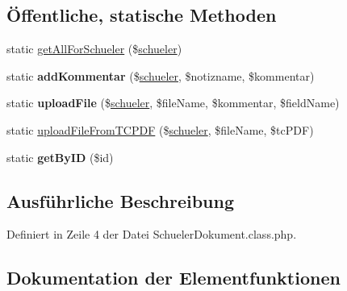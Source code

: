 \subsection*{Öffentliche, statische Methoden}
\begin{DoxyCompactItemize}
\item 
static \mbox{\hyperlink{class_schueler_dokument_ab5274ee21f04891331f5a641cea20159}{get\+All\+For\+Schueler}} (\$\mbox{\hyperlink{classschueler}{schueler}})
\item 
\mbox{\label{class_schueler_dokument_a76832867c529cd42038be064d9ab3fa1}} 
static {\bfseries add\+Kommentar} (\$\mbox{\hyperlink{classschueler}{schueler}}, \$notizname, \$kommentar)
\item 
\mbox{\label{class_schueler_dokument_aa7818f3e6542c35ea49c2fdb0ec122d1}} 
static {\bfseries upload\+File} (\$\mbox{\hyperlink{classschueler}{schueler}}, \$file\+Name, \$kommentar, \$field\+Name)
\item 
static \mbox{\hyperlink{class_schueler_dokument_a262628c42d2294abc7337bdb1440211b}{upload\+File\+From\+T\+C\+P\+DF}} (\$\mbox{\hyperlink{classschueler}{schueler}}, \$file\+Name, \$tc\+P\+DF)
\item 
\mbox{\label{class_schueler_dokument_a034091a21039ac69ad2c37f2c700544a}} 
static {\bfseries get\+By\+ID} (\$id)
\end{DoxyCompactItemize}


\subsection{Ausführliche Beschreibung}


Definiert in Zeile 4 der Datei Schueler\+Dokument.\+class.\+php.



\subsection{Dokumentation der Elementfunktionen}
\mbox{\label{class_schueler_dokument_ab5274ee21f04891331f5a641cea20159}} 

